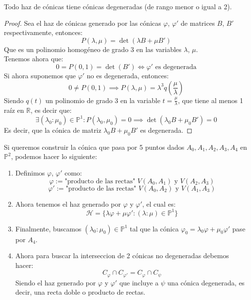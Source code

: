 \begin{proposición}
    Todo haz de cónicas tiene cónicas degeneradas (de rango menor o igual a 2).
\end{proposición}

\begin{proof}
    Sea el haz de cónicas generado por las cónicas $\varphi$, $\varphi'$ de matrices $B$, $B'$ respectivamente, entonces:
    \[
    P(\lambda, \mu) = \det (\lambda B + \mu B')
    \]
    Que es un polinomio homogéneo de grado 3 en las variables $\lambda$, $\mu$.\\
    Tenemos ahora que:
    \[
    0 =
    P(0, 1) =
    \det (B') \iff
    \varphi' \text{ es degenerada}
    \]
    Si ahora suponemos que $\varphi'$ no es degenerada, entonces:
    \[
    0 \neq
    P(0, 1) \implies
    P(\lambda, \mu) =
    \lambda^3 q\left( \frac{\mu}{\lambda} \right)
    \]
    Siendo $q(t)$ un polinomio de grado 3 en la variable $t = \frac{\mu}{\lambda}$, que tiene al menos 1 raíz en $\mathbb{R}$, es decir que:
    \[
    \exists (\lambda_0 : \mu_0) \in \mathbb{P}^1 : 
    P(\lambda_0, \mu_0) = 0 \implies
    \det (\lambda_0 B + \mu_0 B') = 0
    \]
    Es decir, que la cónica de matriz $\lambda_0 B + \mu_0 B'$ es degenerada.
\end{proof}

Si queremos construir la cónica que pasa por 5 puntos dados $A_0, A_1, A_2, A_3, A_4$ en $\mathbb{P}^2$, podemos hacer lo siguiente:
\begin{enumerate}
    \item Definimos $\varphi$, $\varphi'$ como:
    \[
    \varphi := \text{"producto de las rectas" } V(A_0, A_1) \text{ y } V(A_2, A_3)
    \]
    \[
    \varphi' := \text{"producto de las rectas" } V(A_0, A_2) \text{ y } V(A_1, A_3)
    \]
    \item Ahora tenemos el haz generado por $\varphi$ y $\varphi'$, el cual es:
    \[
    \mathcal{H} = \{ \lambda \varphi + \mu \varphi' : (\lambda : \mu) \in \mathbb{P}^1 \}
    \]
    \item Finalmente, buscamos $(\lambda_0 : \mu_0) \in \mathbb{P}^1$ tal que la cónica $\varphi_0 = \lambda_0 \varphi + \mu_0 \varphi'$ pase por $A_4$.
    \item Ahora para buscar la interseccion de 2 cónicas no degeneradas debemos hacer:
    \[
    C_{\varphi} \cap C_{\varphi'} =
    C_{\varphi} \cap C_{\psi}
    \]
    Siendo el haz generado por $\varphi$ y $\varphi'$ que incluye a $\psi$ una cónica degenerada, es decir, una recta doble o producto de rectas.
\end{enumerate}

